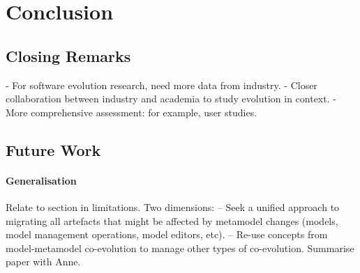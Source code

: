 
\chapter{Conclusion}



\section{Closing Remarks}
- For software evolution research, need more data from industry.
- Closer collaboration between industry and academia to study evolution in context.
- More comprehensive assessment: for example, user studies.

\section{Future Work}
\label{sec:future_work}

\subsubsection{Generalisation}
Relate to section in limitations. Two dimensions:
-- Seek a unified approach to migrating all artefacts that might be affected by metamodel changes (models, model management operations, model editors, etc).
-- Re-use concepts from model-metamodel co-evolution to manage other types of co-evolution. Summarise paper with Anne.

